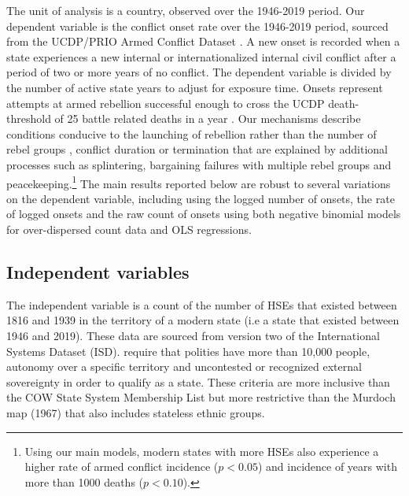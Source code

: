 The unit of analysis is a country, observed over the 1946-2019 period. Our
dependent variable is the conflict onset rate over the 1946-2019 period, sourced
from the UCDP/PRIO Armed Conflict Dataset \citep{Pettersson2020}. A new onset is
recorded when a state experiences a new internal or internationalized internal
civil conflict after a period of two or more years of no conflict. The dependent
variable is divided by the number of active state years to adjust for exposure
time. Onsets represent attempts at armed rebellion successful enough to cross
the UCDP death-threshold of 25 battle related deaths in a year
\citep{Tollefsen2012, Lewis2017}.  Our mechanisms describe conditions conducive
to the launching of rebellion rather than the number of rebel groups
\citep{Fjelde2009}, conflict duration \citep{Cunningham2006} or termination
\citep{Walter2004} that are explained by additional processes such as
splintering, bargaining failures with multiple rebel groups and
peacekeeping.\footnote{Using our main models, modern states with more HSEs also
experience a higher rate of armed conflict incidence ($p<0.05$) and incidence of
years with more than 1000 deaths ($p<0.10$).} The main results reported below
are robust to several variations on the dependent variable, including using the
logged number of onsets, the rate of logged onsets and the raw count of onsets
using both negative binomial models for over-dispersed count data and OLS
regressions. 

\subsection{Independent variables}
    
The independent variable is a count of the number of HSEs that existed between
1816 and 1939 in the territory of a modern state (i.e a state that existed
between 1946 and 2019). These data are sourced from version two of the
International Systems Dataset (ISD). \cite{Butcher2020} require that polities
have more than 10,000 people, autonomy over a specific territory and uncontested
or recognized external sovereignty in order to qualify as a state. These
criteria are more inclusive than the COW State System Membership List
\citep{Sarkees2010} but more restrictive than the Murdoch map (1967) that also
includes stateless ethnic groups. 

